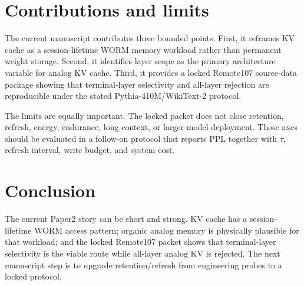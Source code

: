 \section{Contributions and limits}

The current manuscript contributes three bounded points. First, it reframes KV cache as a session-lifetime WORM memory workload rather than permanent weight storage. Second, it identifies layer scope as the primary architecture variable for analog KV cache. Third, it provides a locked Remote107 source-data package showing that terminal-layer selectivity and all-layer rejection are reproducible under the stated Pythia-410M/WikiText-2 protocol.

The limits are equally important. The locked packet does not close retention, refresh, energy, endurance, long-context, or larger-model deployment. Those axes should be evaluated in a follow-on protocol that reports PPL together with $\tau$, refresh interval, write budget, and system cost.

\section{Conclusion}

The current Paper2 story can be short and strong. KV cache has a session-lifetime WORM access pattern; organic analog memory is physically plausible for that workload; and the locked Remote107 packet shows that terminal-layer selectivity is the viable route while all-layer analog KV is rejected. The next manuscript step is to upgrade retention/refresh from engineering probes to a locked protocol.
